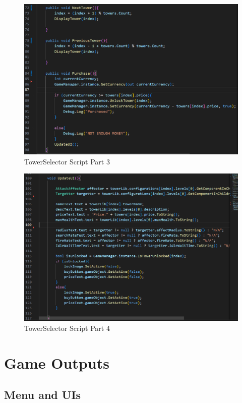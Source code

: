 \documentclass[12pt,a4paper]{report}
\begin{document}
\begin{figure}[h!]
	\centering
	\includegraphics[scale=0.75]{images/TowerSelector3.png}
	\caption{TowerSelector Script Part 3}
	\label{fig:TowerSelector3}
\end{figure}

\begin{figure}[h!]
	\centering
	\includegraphics[scale=0.75]{images/TowerSelector4.png}
	\caption{TowerSelector Script Part 4}
	\label{fig:TowerSelector4}
\end{figure}


\chapter{Game Outputs}
\section{Menu and UIs} 
\end{document}
